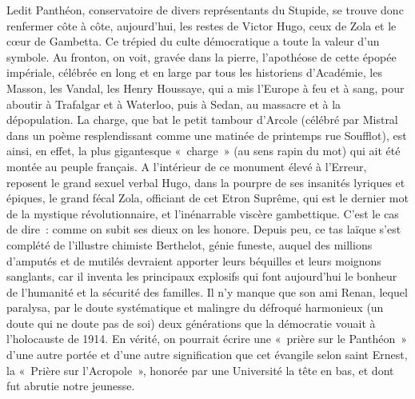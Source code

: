\documentclass[french,twoside]{book} %
\begin{document}
Ledit Panthéon, conservatoire de divers représentants du Stupide, se trouve donc renfermer côte à côte, aujourd’hui, les restes de Victor Hugo, ceux de Zola et le cœur de Gambetta. Ce trépied du culte démocratique a toute la valeur d’un symbole. Au fronton, on voit, gravée dans la pierre, l’apothéose de cette épopée impériale, célébrée en long et en large par tous les historiens d’Académie, les Masson, les Vandal, les Henry Houssaye, qui a mis l’Europe à feu et à sang, pour aboutir à Trafalgar et à Waterloo, puis à Sedan, au massacre et à la dépopulation. La charge, que bat le petit tambour d’Arcole (célébré par Mistral dans un poème resplendissant comme une matinée de printemps rue Soufflot), est ainsi, en effet, la plus gigantesque « charge » (au sens rapin du mot) qui ait été montée au peuple français. A l’intérieur de ce monument élevé à l’Erreur, reposent le grand sexuel verbal Hugo, dans la pourpre de ses insanités lyriques et épiques, le grand fécal Zola, officiant de cet Etron Suprême, qui est le dernier mot de la mystique révolutionnaire, et l’inénarrable viscère gambettique. C’est le cas de dire : comme on subit ses dieux on les honore. Depuis peu, ce tas laïque s’est complété de l’illustre chimiste Berthelot, génie funeste, auquel des millions d’amputés et de mutilés devraient apporter leurs béquilles et leurs moignons sanglants, car il inventa les principaux explosifs qui font aujourd’hui le bonheur de l’humanité et la sécurité des familles. Il n’y manque que son ami Renan, lequel paralysa, par le doute systématique et malingre du défroqué harmonieux (un doute qui ne doute pas de soi) deux générations que la démocratie vouait à l’holocauste de 1914. En vérité, on pourrait écrire une « prière sur le Panthéon » d’une autre portée et d’une autre signification que cet évangile selon saint Ernest, la « Prière sur l’Acropole », honorée par une Université la tête en bas, et dont fut abrutie notre jeunesse.\par
\end{document}
